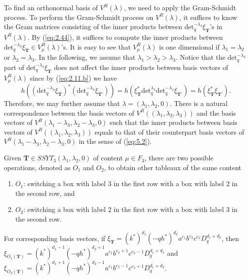 \documentclass[table,a4paper,reqno]{amsart}
\numberwithin{equation}{section}
\theoremstyle{definition}
\begin{document}
To find an orthonormal basis of $V^R(\lambda)$, we need to apply the Gram-Schmidt process. To perform the Gram-Schmidt process on $V^R(\lambda)$, it suffices to know the Gram matrices consisting of the inner products between $\text{det}_q^{-\lambda_3}\xi_{\textbf{T}}$'s in $V^R(\lambda)$. By (\ref{eq:2.44}), it suffices to compute the inner products between $\text{det}_q^{-\lambda_3}\xi_{\textbf{T}}\in V^R_\mu(\lambda)$'s. It is easy to see that $V^R_\mu(\lambda)$ is one dimensional if $\lambda_1=\lambda_2$ or $\lambda_2=\lambda_3$. In the following, we assume that $\lambda_1>\lambda_2>\lambda_3$. Notice that the $\text{det}_q^{-\lambda_3}$ part of $\text{det}_q^{-\lambda_3}\xi_{\textbf{T}}$ does not affect the inner products between basis vectors of $V_\mu^R(\lambda)$ since by (\ref{eq:2.11.b}) we have
\begin{equation}\label{eq:5.2}
    h\left(\left(\text{det}_q^{-\lambda_3}\xi_{\textbf{T}}\right)^*\left(\text{det}_q^{-\lambda_3}\xi_{\textbf{T'}}\right)\right)=h\left(\xi_{\textbf{T}}^*\text{det}_q^{\lambda_3}\text{det}_q^{-\lambda_3}\xi_{\textbf{T'}}\right)=h\left(\xi_{\textbf{T}}^*\xi_{\textbf{T'}}\right).
\end{equation}
Therefore, we may further assume that $\lambda=(\lambda_1,\lambda_2,0)$. There is a natural correspondence between the basis vectors of $V^R((\lambda_1,\lambda_2,\lambda_3))$ and the basis vectors of $V^R(\lambda_1-\lambda_3,\lambda_2-\lambda_3,0)$ such that the inner products between basis vectors of $V^R((\lambda_1,\lambda_2,\lambda_3))$ equals to that of their counterpart basis vectors of $V^R(\lambda_1-\lambda_3,\lambda_2-\lambda_3,0)$ in the sense of (\ref{eq:5.2}).

Given $\textbf{T}\in SSYT_3(\lambda_1,\lambda_2,0)$ of content $\mu\in F_3$, there are two possible operations, denoted as $O_1$ and $O_2$, to obtain other tableaux of the same content
\begin{enumerate}
    \item[1.] $O_1$: switching a box with label $3$ in the first row with a box with label $2$ in the second row, and
    \item[2.] $O_2$: switching a box with label $2$ in the first row with a box with label $3$ in the second row.
\end{enumerate}
For corresponding basis vectors, if $\xi_\textbf{T}=(k^*)^{d_1}(-qh^*)^{d_2}a^{c_1}b^{c_2}c^{c_3}D_q^{d_1+d_2}$, then \\$\xi_{O_1(\textbf{T})}=(k^*)^{d_1-1}(-qh^*)^{d_2+1}a^{c_1}b^{c_2+1}c^{c_3-1}D_q^{d_1+d_2}$ and\\ $\xi_{O_2(\textbf{T})}=(k^*)^{d_1+1}(-qh^*)^{d_2-1}a^{c_1}b^{c_2-1}c^{c_3+1}D_q^{d_1+d_2}$.
\end{document}

